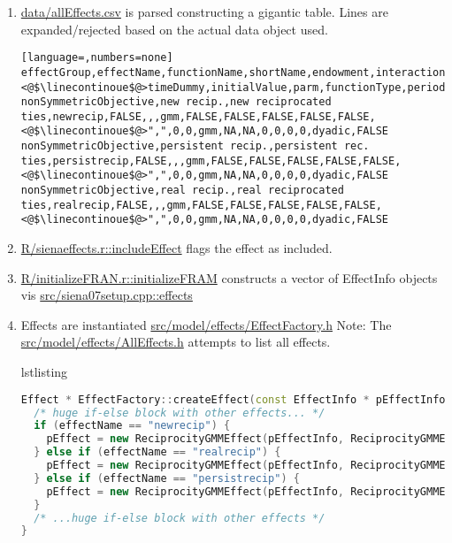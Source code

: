 \documentclass{tufte-handout}
\makeatletter
\newenvironment{listing}[1][htbp]
  {\ifvmode\else\unskip\fi\begin{@tufte@float}[#1]{lstlisting}{}}
  {\end{@tufte@float}}
\newenvironment{listing*}[1][htbp]%
  {\ifvmode\else\unskip\fi\begin{@tufte@float}[#1]{lstlisting}{star}}
  {\end{@tufte@float}}
\newcommand\sourcelinkF[2]{\href{../#1/#2}{\mbox{#1/}\mbox{#2}}}
\newcommand\sourcelinkFF[3]{\href{../#1/#2}{\mbox{#1/}\mbox{#2::#3}}}
\makeatother
\begin{document}
\def\linecontinoue{\textcolor{red}{\ensuremath{\hookrightarrow}}}
\begin{enumerate}
\item \sourcelinkF{data}{allEffects.csv} is parsed constructing a gigantic table.  Lines are expanded/rejected based on the actual data object used.
\begin{listing*}
\caption{
  \texttt{allEffects.csv}: Each line (\linecontinoue continoues a line) is one effect definition for a data scenario.
}
\begin{lstlisting}[language=,numbers=none]
effectGroup,effectName,functionName,shortName,endowment,interaction1,interaction2,type,basicRate,include,randomEffects,fix,test,
<@$\linecontinoue$@>timeDummy,initialValue,parm,functionType,period,rateType,untrimmedValue,effect1,effect2,effect3,interactionType,local
nonSymmetricObjective,new recip.,new reciprocated ties,newrecip,FALSE,,,gmm,FALSE,FALSE,FALSE,FALSE,FALSE,
<@$\linecontinoue$@>",",0,0,gmm,NA,NA,0,0,0,0,dyadic,FALSE
nonSymmetricObjective,persistent recip.,persistent rec. ties,persistrecip,FALSE,,,gmm,FALSE,FALSE,FALSE,FALSE,FALSE,
<@$\linecontinoue$@>",",0,0,gmm,NA,NA,0,0,0,0,dyadic,FALSE
nonSymmetricObjective,real recip.,real reciprocated ties,realrecip,FALSE,,,gmm,FALSE,FALSE,FALSE,FALSE,FALSE,
<@$\linecontinoue$@>",",0,0,gmm,NA,NA,0,0,0,0,dyadic,FALSE
\end{lstlisting}
\end{listing*}

\item \sourcelinkFF{R}{sienaeffects.r}{includeEffect} flags the effect as included.

\item \sourcelinkFF{R}{initializeFRAN.r}{initializeFRAM} constructs a vector of EffectInfo objects vis \sourcelinkFF{src}{siena07setup.cpp}{effects}

\item Effects are instantiated \footnotesize{\sourcelinkF{src/model/effects}{EffectFactory.h}
    Note: The \sourcelinkF{src/model/effects}{AllEffects.h} attempts to list all effects.}
\begin{listing}
  \label{lst:factory}
  \caption{
    \sourcelinkF{src/model/effects}{EffectFacttory.h} consisting mainly of one big conditional.
  }
\begin{lstlisting}[language=c++]
Effect * EffectFactory::createEffect(const EffectInfo * pEffectInfo) const {
  /* huge if-else block with other effects... */
  if (effectName == "newrecip") {
    pEffect = new ReciprocityGMMEffect(pEffectInfo, ReciprocityGMMEffect::NEW);
  } else if (effectName == "realrecip") {
    pEffect = new ReciprocityGMMEffect(pEffectInfo, ReciprocityGMMEffect::REAL);
  } else if (effectName == "persistrecip") {
    pEffect = new ReciprocityGMMEffect(pEffectInfo, ReciprocityGMMEffect::PERSISTENT);
  }
  /* ...huge if-else block with other effects */
}
\end{lstlisting}
\end{listing}
\end{enumerate}
\end{document}

